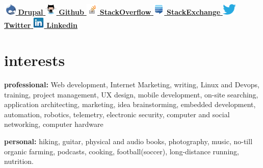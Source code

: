 \documentclass[]{friggeri-cv} %
\begin{document}
	
    \href{http://drupal.org/user/34622}{\includegraphics[height=16pt]{druplicon.png}  \textbf{Drupal }} \href{https://github.com/frazras}{\includegraphics[height=16pt]{octocat.png}  \textbf{Github }}
    \href{http://stackoverflow.com/users/1106420/frazras}{\includegraphics[height=16pt]{stackoverflow.png}  \textbf{StackOverflow }}
    \href{http://stackexchange.com/users/530574/frazras?tab=accounts}{\includegraphics[height=16pt]{stackexchange.png}  \textbf{StackExchange }}
    \href{http://twitter.com/frazras}{\includegraphics[height=16pt]{twitter.eps}  \textbf{Twitter }}
    \href{http://jm.linkedin.com/in/rohansmith}{\includegraphics[height=16pt]{linkedin.png}  \textbf{Linkedin }}


\section{interests}

\textbf{professional:} Web development, Internet Marketing, writing, Linux and Devops, training, project management, UX design, mobile development, on-site searching, application architecting, marketing, idea brainstorming, embedded development, automation, robotics, telemetry, electronic security, computer and social networking, computer hardware

\textbf{personal:} hiking, guitar, physical and audio books, photography, music, no-till organic farming, podcasts, cooking, football(soccer), long-distance running, nutrition.

\end{document}
